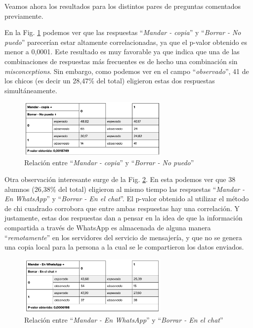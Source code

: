 Veamos ahora los resultados para los distintos pares de preguntas comentados previamente.

En la Fig. \ref{fig:analisis32} podemos ver que las respuestas ``\textit{Mandar - copia}'' y ``\textit{Borrar - No puedo}'' parecerían estar altamente correlacionadas, ya que el p-valor obtenido es menor a 0,0001. Este resultado es muy favorable ya que indica que una de las combinaciones de respuestas más frecuentes es de hecho una combinación sin \textit{misconceptions}. Sin embargo, como podemos ver en el campo ``\textit{observado}'', 41 de los chicos (es decir un 28,47\% del total) eligieron estas dos respuestas simultáneamente.

\begin{figure}[h]
    \centering
    \includegraphics[width=0.65\textwidth]{images_analisis/32.png}
    \caption{Relación entre ``\textit{Mandar - copia}'' y ``\textit{Borrar - No puedo}''}
    \label{fig:analisis32}
\end{figure}

\newpage

Otra observación interesante surge de la Fig. \ref{fig:analisis33}. En esta podemos ver que 38 alumnos (26,38\% del total) eligieron al mismo tiempo las respuestas ``\textit{Mandar - En WhatsApp}'' y ``\textit{Borrar - En el chat}''. El p-valor obtenido al utilizar el método de chi cuadrado corrobora que entre ambas respuestas hay una correlación. Y justamente, estas dos respuestas dan a pensar en la idea de que la información compartida a través de WhatsApp es almacenada de alguna manera ``\textit{remotamente}'' en los servidores del servicio de mensajería, y que no se genera una copia local para la persona a la cual se le compartieron los datos enviados.  

\begin{figure}[h]
    \centering
    \includegraphics[width=0.65\textwidth]{images_analisis/33.png}
    \caption{Relación entre ``\textit{Mandar - En WhatsApp}'' y ``\textit{Borrar - En el chat}''}
    \label{fig:analisis33}
\end{figure}

